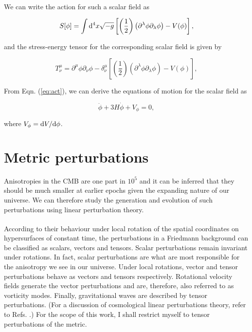 \documentclass[12pt,a4paper,oneside]{book}
\begin{document}
\paragraph*{} We can write the action for such a scalar field as 

\begin{equation}\label{eq:act}
S[\phi] = \int {\rm d}^4x \sqrt{-g}\left[ \left(\frac{1}{2}\right)\left(\partial^{\lambda}\phi \partial_{\lambda}\phi\right) - V(\phi)\right],
\end{equation}

\noindent and the stress-energy tensor for the corresponding scalar field is given by

\begin{equation}\label{eq:se}
T^{\mu}_{\nu} = \partial^{\mu}\phi \partial_{\nu}\phi -\delta^{\mu}_{\nu}\left[\left(\frac{1}{2}\right)\left(\partial^{\lambda}\phi \partial_{\lambda}\phi\right) - V(\phi)\right],
\end{equation}

\noindent From Eqn. (\ref{eq:act}), we can derive the equations of motion for the scalar field as

\begin{equation}\label{eq:feq}
\ddot{\phi} + 3H\dot{\phi} + V_{\phi} = 0,
\end{equation}

\noindent where $V_{\phi} = {\rm d}V/{\rm d}\phi$.

\section{Metric perturbations}

\paragraph*{} Anisotropies in the CMB are one part in $10^5$ and it can be inferred that they should be much smaller at earlier 
epochs given the expanding nature of our universe. We can therefore study the generation and evolution of such perturbations using 
linear perturbation theory. 

\paragraph*{} According to their behaviour under local rotation of the spatial coordinates on hypersurfaces of constant time, 
the perturbations in a Friedmann background can be classified as scalars, vectors and tensors. Scalar perturbations remain 
invariant under rotations. In fact, scalar perturbations are what are most responsible for the 
anisotropy we see in our universe. Under local rotations, vector and tensor perturbations behave as vectors and tensors 
respectively. Rotational velocity fields generate the vector perturbations and are, therefore, also referred to 
as vorticity modes. Finally, gravitational waves are described by tensor perturbations. 
(For a discussion of cosmological linear perturbations theory, refer to Refs. 
\cite{Sriramkumar L - 2009, Dodelson, Durrer, Riotto, Kinney, Linde, B1, B2, G1, AG}.)
For the scope of this work, I shall restrict myself to tensor perturbations of the metric.
\end{document}
